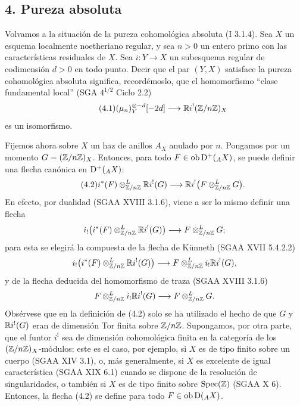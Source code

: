 \subsection*{4. Pureza absoluta}

Volvamos a la situación de la pureza cohomológica absoluta (I 3.1.4). Sea $X$ un esquema localmente noetheriano regular, y sea $n>0$ un entero primo con las características residuales de $X$. Sea $i:Y\to X$ un subesquema regular de codimensión $d>0$ en todo punto. Decir que el par $(Y,X)$ satisface la pureza cohomológica absoluta significa, recordémoslo, que el homomorfismo ``clase fundamental local'' (SGA $4^{1/2}$ Ciclo 2.2)
\begin{equation}\tag{4.1}
        (\mu_n)_Y^{\otimes -d}[-2d]\longrightarrow \mathbb{R} i^!(\mathbb{Z}/n\mathbb{Z})_X
\end{equation}
es un isomorfismo.

Fijemos ahora sobre $X$ un haz de anillos $A_X$ anulado por $n$. Pongamos por un momento $G=(\mathbb{Z}/n\mathbb{Z})_X$. Entonces, para todo $F\in\operatorname{ob}\mathrm{D}^+({}_A X)$, se puede definir una flecha canónica en $\mathrm{D}^+({}_A X)$:
\begin{equation}\tag{4.2}
        i^*(F)\otimes^L_{\mathbb{Z}/n\mathbb{Z}} \mathbb{R} i^!(G)\longrightarrow \mathbb{R} i^!\bigl(F\otimes^L_{\mathbb{Z}/n\mathbb{Z}}G\bigr).
\end{equation}
En efecto, por dualidad (SGAA XVIII 3.1.6), viene a ser lo mismo definir una flecha
\[
        i_!\bigl(i^*(F)\otimes^L_{\mathbb{Z}/n\mathbb{Z}}\mathbb{R} i^!(G)\bigr)\longrightarrow F\otimes^L_{\mathbb{Z}/n\mathbb{Z}}G;
\]
para esta se elegirá la compuesta de la flecha de Künneth (SGAA XVII 5.4.2.2)
\[
        i_!\bigl(i^*(F)\otimes^L_{\mathbb{Z}/n\mathbb{Z}}\mathbb{R} i^!(G)\bigr)\longrightarrow F\otimes^L_{\mathbb{Z}/n\mathbb{Z}}i_!\mathbb{R} i^!(G),
\]
y de la flecha deducida del homomorfismo de traza (SGAA XVIII 3.1.6)
\[
        F\otimes^L_{\mathbb{Z}/n\mathbb{Z}}i_!\mathbb{R} i^!(G)\longrightarrow F\otimes^L_{\mathbb{Z}/n\mathbb{Z}}G.
\]
Obsérvese que en la definición de (4.2) solo se ha utilizado el hecho de que $G$ y $\mathbb{R} i^!(G)$ eran de dimensión Tor finita sobre $\mathbb{Z}/n\mathbb{Z}$. Supongamos, por otra parte, que el funtor $i^!$ sea de dimensión cohomológica finita en la categoría de los $(\mathbb{Z}/n\mathbb{Z})_X$-módulos: este es el caso, por ejemplo, si $X$ es de tipo finito sobre un cuerpo (SGAA XIV 3.1), o, más generalmente, si $X$ es excelente de igual característica (SGAA XIX 6.1) cuando se dispone de la resolución de singularidades, o también si $X$ es de tipo finito sobre $\operatorname{Spec}(\mathbb{Z})$ (SGAA X 6). Entonces, la flecha (4.2) se define para todo $F\in\operatorname{ob}\mathrm{D}({}_A X)$.


